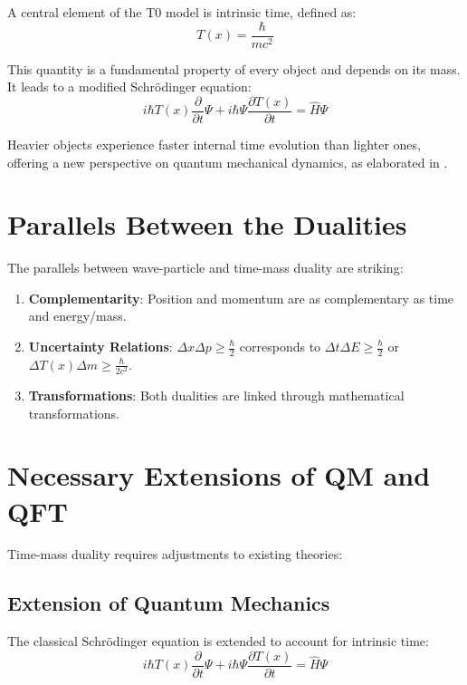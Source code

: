 \documentclass[a4paper,12pt]{article}
\newcommand{\Tfield}{T(x)}
\begin{document}
	A central element of the T0 model is intrinsic time, defined as:
	\begin{equation}
		\Tfield = \frac{\hbar}{m c^2}
	\end{equation}
	
	This quantity is a fundamental property of every object and depends on its mass. It leads to a modified Schrödinger equation:
	\begin{equation}
		i\hbar \Tfield \frac{\partial}{\partial t} \Psi + i\hbar \Psi \frac{\partial \Tfield}{\partial t} = \hat{H} \Psi
	\end{equation}
	
	Heavier objects experience faster internal time evolution than lighter ones, offering a new perspective on quantum mechanical dynamics, as elaborated in \cite{pascher_quantum_2025}.
	
	\section{Parallels Between the Dualities}
	
	The parallels between wave-particle and time-mass duality are striking:
	\begin{enumerate}
		\item \textbf{Complementarity}: Position and momentum are as complementary as time and energy/mass.
		\item \textbf{Uncertainty Relations}: \(\Delta x \Delta p \geq \frac{\hbar}{2}\) corresponds to \(\Delta t \Delta E \geq \frac{\hbar}{2}\) or \(\Delta \Tfield \Delta m \geq \frac{\hbar}{2c^2}\).
		\item \textbf{Transformations}: Both dualities are linked through mathematical transformations.
	\end{enumerate}
	
	\section{Necessary Extensions of QM and QFT}
	
	Time-mass duality requires adjustments to existing theories:
	
	\subsection{Extension of Quantum Mechanics}
	
	The classical Schrödinger equation is extended to account for intrinsic time:
	\begin{equation}
		i\hbar \Tfield \frac{\partial}{\partial t} \Psi + i\hbar \Psi \frac{\partial \Tfield}{\partial t} = \hat{H} \Psi
	\end{equation}
	
\end{document}
